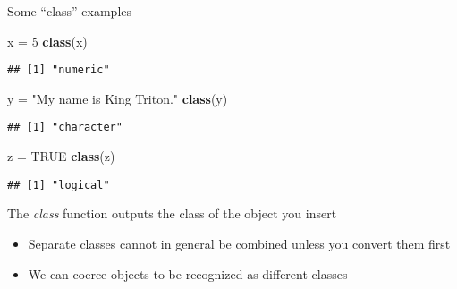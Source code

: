 \documentclass[ignorenonframetext,]{beamer}
\newenvironment{Shaded}{\begin{snugshade}}{\end{snugshade}}
\newcommand{\KeywordTok}[1]{\textcolor[rgb]{0.13,0.29,0.53}{\textbf{#1}}}
\newcommand{\DecValTok}[1]{\textcolor[rgb]{0.00,0.00,0.81}{#1}}
\newcommand{\StringTok}[1]{\textcolor[rgb]{0.31,0.60,0.02}{#1}}
\newcommand{\OtherTok}[1]{\textcolor[rgb]{0.56,0.35,0.01}{#1}}
\newcommand{\NormalTok}[1]{#1}
\providecommand{\tightlist}{%
	\setlength{\itemsep}{0pt}\setlength{\parskip}{0pt}}
\begin{document}
\begin{frame}[fragile]{Some ``class'' examples}

\begin{Shaded}
\begin{Highlighting}[]
\NormalTok{x =}\StringTok{ }\DecValTok{5}
\KeywordTok{class}\NormalTok{(x)}
\end{Highlighting}
\end{Shaded}

\begin{verbatim}
## [1] "numeric"
\end{verbatim}

\begin{Shaded}
\begin{Highlighting}[]
\NormalTok{y =}\StringTok{ "My name is King Triton."}
\KeywordTok{class}\NormalTok{(y)}
\end{Highlighting}
\end{Shaded}

\begin{verbatim}
## [1] "character"
\end{verbatim}

\begin{Shaded}
\begin{Highlighting}[]
\NormalTok{z =}\StringTok{ }\OtherTok{TRUE}
\KeywordTok{class}\NormalTok{(z)}
\end{Highlighting}
\end{Shaded}

\begin{verbatim}
## [1] "logical"
\end{verbatim}

\end{frame}

\begin{frame}{The \textit{class} function outputs the class of the
object you insert}

\begin{itemize}
\tightlist
\item
  Separate classes cannot in general be combined unless you convert them
  first
\item
  We can \alert{coerce} objects to be recognized as different classes
\end{itemize}

\end{frame}
\end{document}
